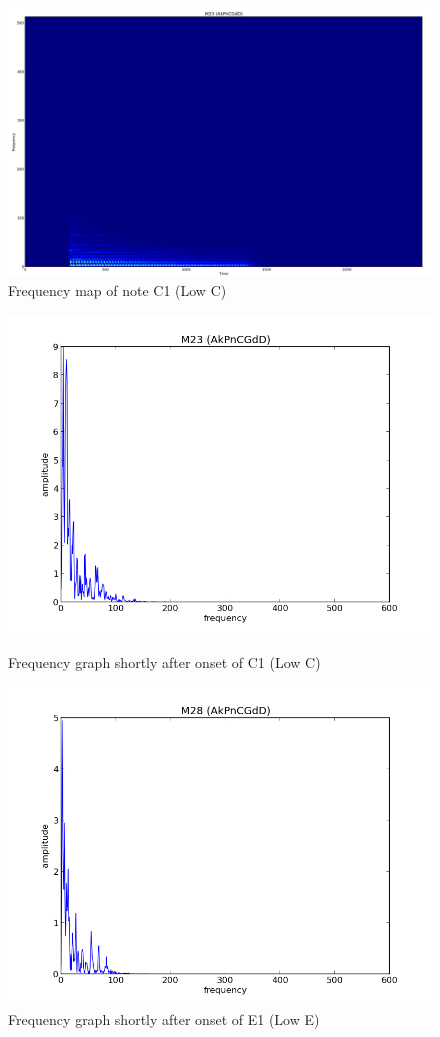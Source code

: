 \documentclass{article}
\begin{document}
\begin{figure}
\includegraphics[scale=.12]{freq_m23.png}
\caption{Frequency map of note C1 (Low C)}
\label{fig:freqs}
\end{figure}

\begin{figure}
\includegraphics[scale=.4]{singlefreq_m23.png}
\caption{Frequency graph shortly after onset of C1 (Low C)}
\includegraphics[scale=.4]{singlefreq_m28.png}
\caption{Frequency graph shortly after onset of E1 (Low E)}
\label{fig:single_freqs}
\end{figure}



\end{document}
